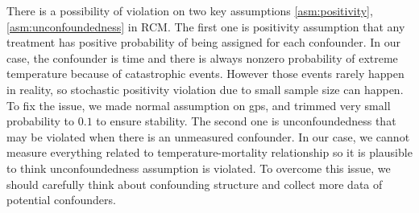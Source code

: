 \documentclass[12pt]{article}
\begin{document}
There is a possibility of violation on 
two key assumptions \ref{asm:positivity},\ref{asm:unconfoundedness} in RCM.
The first one is positivity assumption
that any treatment has positive probability of being assigned for each confounder.
In our case, the confounder is time and 
there is always nonzero probability of extreme temperature because of catastrophic events.
However those events rarely happen in reality, 
so stochastic positivity violation\cite{zivich2022} due to small sample size can happen.
To fix the issue, we made normal assumption on gps,
and trimmed very small probability to $0.1$ to ensure stability.
The second one is unconfoundedness
that may be violated when there is an unmeasured confounder.
In our case, we cannot measure everything related to temperature-mortality relationship
so it is plausible to think unconfoundedness assumption is violated.
To overcome this issue, we should carefully think about confounding structure
and collect more data of potential confounders.


{}

\end{document}
